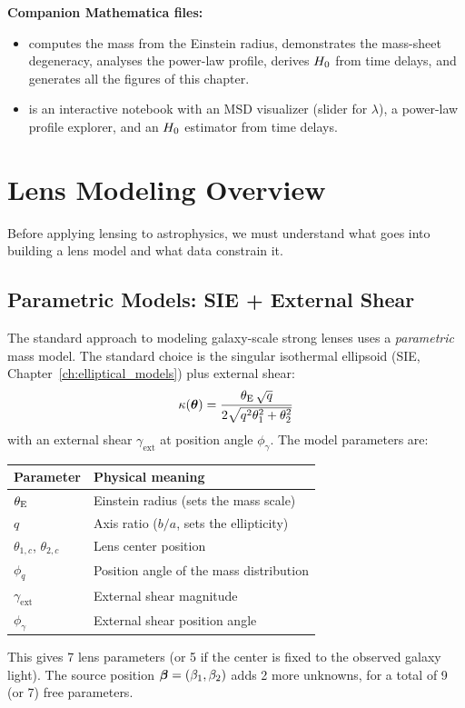 \medskip
\noindent
\textbf{Companion Mathematica files:}
\begin{itemize}[nosep]
    \item {}
          computes the mass from the Einstein radius, demonstrates
          the mass-sheet degeneracy, analyses the power-law profile,
          derives $H_0$ from time delays, and generates all the
          figures of this chapter.
    \item {}
          is an interactive notebook with an MSD visualizer (slider
          for $\lambda$), a power-law profile explorer, and an
          $H_0$ estimator from time delays.
\end{itemize}


\section{Lens Modeling Overview}
\label{sec:lens_modeling_overview}

Before applying lensing to astrophysics, we must understand what goes
into building a lens model and what data constrain it.

\subsection{Parametric Models: SIE + External Shear}

The standard approach to modeling galaxy-scale strong lenses uses a
\emph{parametric} mass model.  The standard choice is the singular
isothermal ellipsoid (SIE, Chapter~\ref{ch:elliptical_models}) plus
external shear:
\begin{equation}
    \kappa(\boldsymbol{\theta}) = \frac{\theta_{\mathrm{E}}\,\sqrt{q}}{
    2\sqrt{q^2\theta_1^2 + \theta_2^2}}
    \label{eq:sie_kappa_recap}
\end{equation}
with an external shear $\gamma_{\mathrm{ext}}$ at position angle
$\phi_\gamma$.  The model parameters are:
\begin{center}
\begin{tabular}{ll}
\toprule
\textbf{Parameter} & \textbf{Physical meaning} \\
\midrule
$\theta_{\mathrm{E}}$ & Einstein radius (sets the mass scale) \\
$q$ & Axis ratio ($b/a$, sets the ellipticity) \\
$\theta_{1,c}$, $\theta_{2,c}$ & Lens center position \\
$\phi_q$ & Position angle of the mass distribution \\
$\gamma_{\mathrm{ext}}$ & External shear magnitude \\
$\phi_\gamma$ & External shear position angle \\
\bottomrule
\end{tabular}
\end{center}
This gives 7 lens parameters (or 5 if the center is fixed to the
observed galaxy light).  The source position $\boldsymbol{\beta} =
(\beta_1, \beta_2)$ adds 2 more unknowns, for a total of 9 (or 7)
free parameters.

